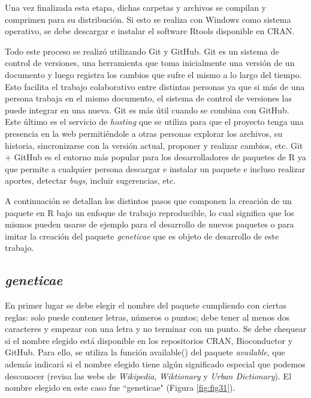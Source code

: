 Una vez finalizada esta etapa, dichas carpetas y archivos se compilan y comprimen para su distribución. Si esto se realiza con Windows como sistema operativo, se debe descargar e instalar el software Rtools disponible en CRAN. 

Todo este proceso se realizó utilizando Git y GitHub. Git es un sistema de control de versiones, una herramienta que toma inicialmente una versión de un documento y luego registra los cambios que sufre el mismo a lo largo del tiempo. Esto facilita el trabajo colaborativo entre distintas personas ya que si más de una persona trabaja en el mismo documento, el sistema de control de versiones las puede integrar en una nueva. Git es más útil cuando se combina con GitHub. Este último es el servicio de \emph{hosting} que se utiliza para que el proyecto tenga una presencia en la web permitiéndole a otras personas explorar los archivos, su historia, sincronizarse con la versión actual, proponer y realizar cambios, etc. Git + GitHub es el entorno más popular para los desarrolladores de paquetes de R ya que permite a cualquier persona descargar e instalar un paquete e incluso realizar aportes, detectar \emph{bugs}, incluir sugerencias, etc.


A continuación se detallan los distintos pasos que componen la creación de un paquete en R bajo un enfoque de trabajo reproducible, lo cual significa que los mismos pueden usarse de ejemplo para el desarrollo de nuevos paquetes o para imitar la creación del paquete \emph{geneticae} que es objeto de desarrollo de este trabajo. 

\subsection{\emph{geneticae}}

En primer lugar se debe elegir el nombre del paquete cumpliendo con ciertas reglas: solo puede contener letras, números o puntos; debe tener al menos dos caracteres y empezar con una letra y no terminar con un punto. Se debe chequear si el nombre elegido está disponible en los repositorios  CRAN, Bioconductor y GitHub. Para ello, se utiliza la función \textcolor{fandango}{available()} del paquete \emph{available}, que además indicará si el nombre elegido tiene algún significado especial que podemos desconocer (revisa las webs de \emph{Wikipedia}, \emph{Wiktionary} y \emph{Urban Dictionary}). El nombre elegido en este caso fue ``geneticae"  (Figura \ref{fig:fig31}). 

